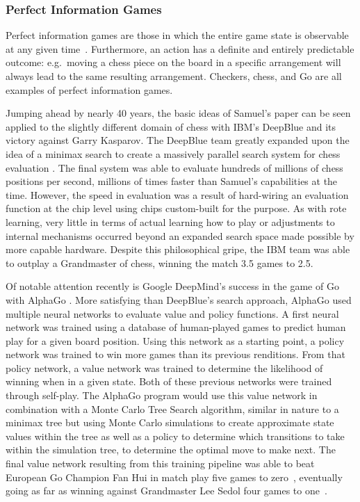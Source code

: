 

\subsubsection*{Perfect Information Games}

Perfect information games are those in which the entire game state is observable
at any given time~\cite{perfinfo}.
%
Furthermore,
an action has a definite and entirely predictable outcome:
e.g.\  moving a chess piece on the board in a specific arrangement will always
lead to the same resulting arrangement.
%
Checkers, chess, and Go are all examples of perfect information games.

Jumping ahead by nearly 40 years,
the basic ideas of Samuel's paper can be seen applied to the slightly different
domain of chess with IBM's DeepBlue
and its victory against Garry Kasparov.
%
The DeepBlue team greatly expanded upon the idea of a minimax search to create a
massively parallel search system for chess evaluation
\cite{ibm_deepblue}.
%
The final system was able to evaluate hundreds of millions of chess positions
per second,
millions of times faster than Samuel's capabilities at the time.
%
However,
the speed in evaluation was a result of hard-wiring an evaluation function at
the chip level using chips custom-built for the purpose.
%
As with rote learning,
very little in terms of actual learning how to play or adjustments to internal
mechanisms occurred
beyond an expanded search space made possible by more capable hardware.
%
Despite this philosophical gripe,
the IBM team was able to outplay a Grandmaster of chess,
winning the match 3.5 games to 2.5.


Of notable attention recently is Google DeepMind's
success in the game of Go with AlphaGo
\cite{deepmind_alphago}.
%
More satisfying than DeepBlue's search approach,
AlphaGo used multiple neural networks to evaluate value and policy functions.
%
A first neural network was trained using a database of human-played games
to predict human play for a given board position.
%
Using this network as a starting point,
a policy network was trained to win more games than its previous renditions.
%
From that policy network,
a value network was trained to determine the likelihood of winning when in a
given state.
%
Both of these previous networks were trained through self-play.
%
The AlphaGo program would use this value network in combination with a
Monte Carlo Tree Search algorithm,
similar in nature to a minimax tree
but using Monte Carlo simulations to create approximate state values within the
tree as well as a policy to determine which transitions to take within the
simulation tree,
to determine the optimal move to make next.
%
The final value network resulting from this training pipeline was able to beat
European Go Champion Fan Hui in match play
five games to zero~\cite{deepmind_alphago},
eventually going as far as winning against
Grandmaster Lee Sedol four games to one~\cite{deepmind_overview}.

